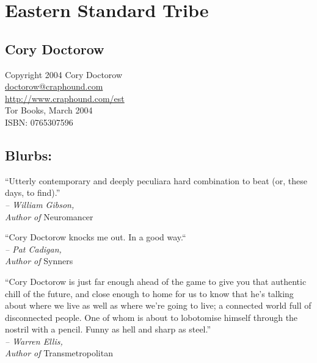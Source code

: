 

\section{Eastern Standard Tribe}

\subsection{Cory Doctorow}
\begin{flushleft}
Copyright 2004 Cory Doctorow\\
\href{mailto:doctorow@craphound.com}{doctorow@craphound.com}\\
\href{http://www.craphound.com/est}{http://www.craphound.com/est}\\
Tor Books, March 2004\\
ISBN: 0765307596\\
\end{flushleft}

\subsection{Blurbs:}
{
\setlength{\parindent}{0pt}

“Utterly contemporary and deeply peculiar{\dash}a hard combination to
beat (or, these days, to find).”
\\
\hspace*{\fill}\emph{-- William Gibson,\\\hspace*{\fill}Author of} Neuromancer

\bigskip

“Cory Doctorow knocks me out. In a good way.“
\\
\hspace*{\fill}\emph{-- Pat Cadigan,\\\hspace*{\fill} Author of} Synners

\bigskip

“Cory Doctorow is just far enough ahead of the game to give you
that authentic chill of the future, and close enough to home for us
to know that he’s talking about where we live as well as where
we’re going to live; a connected world full of disconnected people.
One of whom is about to lobotomise himself through the nostril with
a pencil. Funny as hell and sharp as
steel.”
\\
\hspace*{\fill}\emph{-- Warren Ellis,\\\hspace*{\fill}Author of} 
Transmetropolitan}

